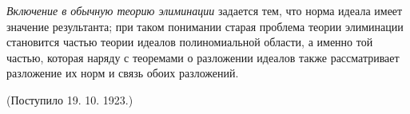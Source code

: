 \documentclass[11pt]{article}
\begin{document}
\emph{Включение в обычную теорию элиминации} задается тем, что норма идеала имеет значение результанта; при таком понимании старая проблема теории элиминации становится частью теории идеалов полиномиальной области, а именно той частью, которая наряду с теоремами о разложении идеалов также рассматривает разложение их норм и связь обоих разложений.

\begin{center}
(Поступило 19. 10. 1923.)
\end{center}
\end{document}
